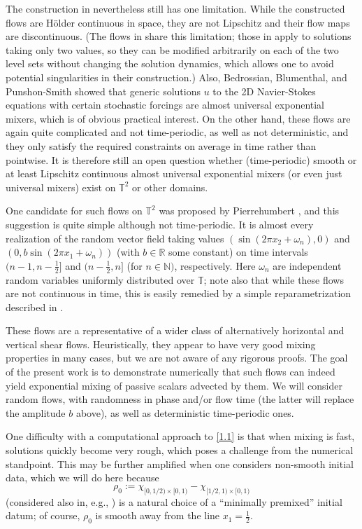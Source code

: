 \documentclass[12pt]{article}
\numberwithin{figure}{section}
\numberwithin{equation}{section}
\newcommand{\beq}{\begin{equation}}
\newcommand{\eeq}{\end{equation}}
\newcommand{\lb}{\label}
\newcommand{\bbN}{{\mathbb{N}}}
\newcommand{\bbR}{{\mathbb{R}}}
\newcommand{\bbT}{{\mathbb{T}}}
\begin{document}
The construction in \cite{ElgZla} nevertheless still has one limitation.  While the constructed flows are H\" older continuous in space, they are not Lipschitz and their flow maps are discontinuous.  (The flows in \cite{YaoZla} share this limitation;  those in \cite{ACM2} apply to solutions taking only two values, so they can be modified arbitrarily on each of the two level sets without changing the solution dynamics, which allows one to avoid potential singularities in their construction.)  Also, Bedrossian, Blumenthal, and Punshon-Smith \cite{BBP} showed that generic solutions $u$ to the 2D Navier-Stokes equations with certain stochastic forcings are almost universal exponential mixers, which is of obvious practical interest.  On the other hand, these flows  are again quite complicated and not time-periodic, as well as not deterministic, and they only satisfy the required constraints on average in time rather than pointwise.  It is therefore still an open question whether (time-periodic) smooth or at least Lipschitz continuous almost universal exponential mixers (or even just universal mixers) exist on $\bbT^2$ or other domains.


One candidate for such flows on $\bbT^2$ was proposed by Pierrehumbert \cite{Pie,Pie2},
and this suggestion is quite simple although not time-periodic.  It is almost every realization of the random vector field taking values $(\sin(2\pi x_2+\omega_n),0)$ and $(0,b\sin(2\pi x_1+\omega_n))$ (with $b\in\bbR$ some constant) on time intervals $(n-1,n-\frac 12]$ and $(n-\frac 12, n]$ (for $n\in\bbN)$, respectively.  Here  $\omega_n$ are independent random variables uniformly distributed over $\bbT$; note also that while these flows are not continuous in time, this is easily remedied by a simple reparametrization described in \cite{YaoZla}.

These flows are a representative of a wider class of alternatively horizontal and vertical shear flows. Heuristically, they appear to have very good mixing properties in many cases, but we are not aware of any rigorous proofs.
The goal of the present work is to demonstrate numerically that such flows can indeed yield exponential mixing of passive scalars advected by them.  We will consider random flows, with randomness in phase and/or flow time (the latter will replace the amplitude $b$ above), as well as deterministic time-periodic ones.

One difficulty with a computational approach to \eqref{1.1} is that when mixing is fast, solutions quickly become very rough, which poses a challenge from the numerical standpoint.  This may be further amplified when one considers non-smooth initial data, which we will do here because
\beq \lb{1.2}
\rho_0:= \chi_{[0,1/2)\times[0,1)} - \chi_{[1/2,1)\times[0,1)}
\eeq  
(considered also in, e.g., \cite{Bressan, ACM2}) is a natural choice of a ``minimally premixed''  initial datum; of course, $\rho_0$ is smooth away from the line $x_1=\frac 12$.
\end{document}
